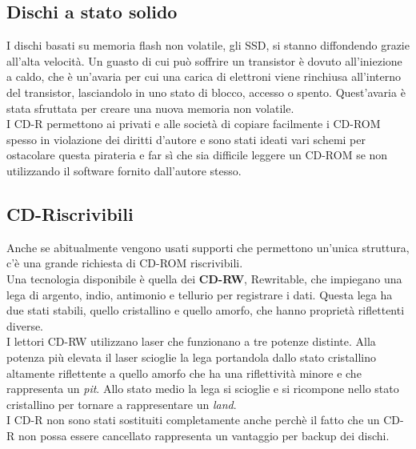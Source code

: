 \documentclass[12pt]{report}
\begin{document}
\subsection{Dischi a stato solido}
I dischi basati su memoria flash non volatile, gli SSD, si stanno diffondendo grazie all'alta velocità. Un guasto di cui può soffrire un transistor è dovuto all'iniezione a caldo, che è un'avaria per cui una carica di elettroni viene rinchiusa all'interno del transistor, lasciandolo in uno stato di blocco, accesso o spento. Quest'avaria è stata sfruttata per creare una nuova memoria non volatile. \\
I CD-R permettono ai privati e alle società di copiare facilmente i CD-ROM spesso in violazione dei diritti d'autore e sono stati ideati vari schemi per ostacolare questa pirateria e far sì che sia difficile leggere un CD-ROM se non utilizzando il software fornito dall'autore stesso.
\subsection{CD-Riscrivibili}
Anche se abitualmente vengono usati supporti che permettono un'unica struttura, c'è una grande richiesta di CD-ROM riscrivibili. \\
Una tecnologia disponibile è quella dei \textbf{CD-RW}, Rewritable, che impiegano una lega di argento, indio, antimonio e tellurio per registrare i dati. Questa lega ha due stati stabili, quello cristallino e quello amorfo, che hanno proprietà riflettenti diverse. \\
I lettori CD-RW utilizzano laser che funzionano a tre potenze distinte. Alla potenza più elevata il laser scioglie la lega portandola dallo stato cristallino altamente riflettente a quello amorfo che ha una riflettività minore e che rappresenta un \textit{pit}. Allo stato medio la lega si scioglie e si ricompone nello stato cristallino per tornare a rappresentare un \textit{land}.\\
I CD-R non sono stati sostituiti completamente anche perchè il fatto che un CD-R non possa essere cancellato rappresenta un vantaggio per backup dei dischi.
\end{document}
